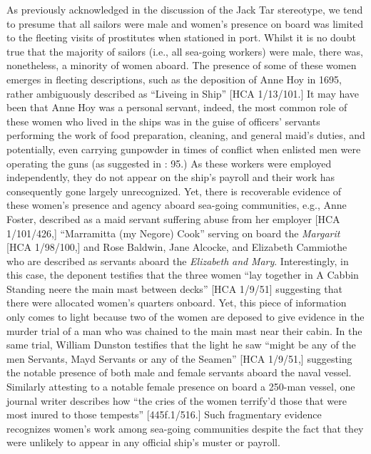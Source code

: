  As previously acknowledged in the discussion of the Jack Tar stereotype, we tend to presume that all sailors were male and women’s presence on board was limited to the fleeting visits of prostitutes when stationed in port. Whilst it is no doubt true that the majority of sailors (i.e., all sea-going workers) were male, there was, nonetheless, a minority of women aboard. The presence of some of these women emerges in fleeting descriptions, such as the deposition of Anne Hoy in 1695, rather ambiguously described as “Liveing in Ship” [HCA 1/13/101.]  It may have been that Anne Hoy was a personal servant, indeed, the most common role of these women who lived in the ships was in the guise of officers’ servants performing the work of food preparation, cleaning, and general maid’s duties, and potentially, even carrying gunpowder in times of conflict when enlisted men were operating the guns (as suggested in \citealt{Brown2011}: 95.) As these workers were employed independently, they do not appear on the ship’s payroll and their work has consequently gone largely unrecognized. Yet, there is recoverable evidence of these women’s presence and agency aboard sea-going communities, e.g., Anne Foster, described as a maid servant suffering abuse from her employer [HCA 1/101/426,] “Marramitta (my Negore) Cook” serving on board the \textit{Margarit} [HCA 1/98/100,] and Rose Baldwin, Jane Alcocke, and Elizabeth Cammiothe who are described as servants aboard the \textit{Elizabeth} \textit{and} \textit{Mary}. Interestingly, in this case, the deponent testifies that the three women “lay together in A Cabbin Standing neere the main mast between decks” [HCA 1/9/51] suggesting that there were allocated women’s quarters onboard. Yet, this piece of information only comes to light because two of the women are deposed to give evidence in the murder trial of a man who was chained to the main mast near their cabin. In the same trial, William Dunston testifies that the light he saw “might be any of the men Servants, Mayd Servants or any of the Seamen” [HCA 1/9/51,] suggesting the notable presence of both male and female servants aboard the naval vessel. Similarly attesting to a notable female presence on board a 250-man vessel, one journal writer describes how “the cries of the women terrify’d those that were most inured to those tempests” [445f.1/516.] Such fragmentary evidence recognizes women’s work among sea-going communities despite the fact that they were unlikely to appear in any official ship’s muster or payroll. 

